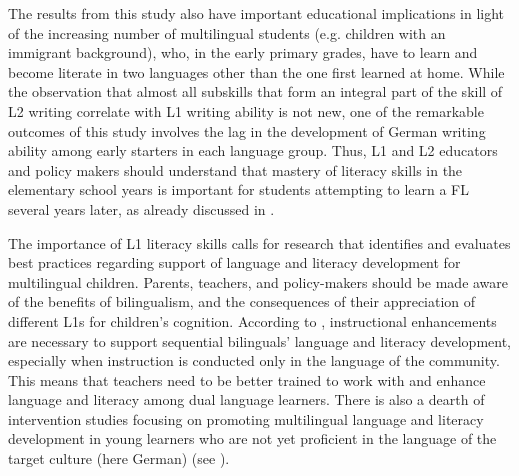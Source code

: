 \documentclass[output=paper,modfonts,nonflat,newtxmath]{langsci/langscibook}
\begin{document}
The results from this study also have important educational implications in light of the increasing number of multilingual students (e.g. children with an immigrant background), who, in the early primary grades, have to learn and become literate in two languages other than the one first learned at home. While the observation that almost all subskills that form an integral part of the skill of L2 writing correlate with L1 writing ability is not new, one of the remarkable outcomes of this study involves the lag in the development of German writing ability among early starters in each language group. Thus, L1 and L2 educators and policy makers should understand that mastery of literacy skills in the elementary school years is important for students attempting to learn a FL several years later, as already discussed in \citet{Pfenninger2014}.

The importance of L1 literacy skills calls for research that identifies and evaluates best practices regarding support of language and literacy development for multilingual children. Parents, teachers, and policy-makers should be made aware of the benefits of bilingualism, and the consequences of their appreciation of different L1s for children’s cognition. According to \citet{GoldenbergEtAl2006}, instructional enhancements are necessary to support sequential bilinguals’ language and literacy development, especially when instruction is conducted only in the language of the community. This means that teachers need to be better trained to work with and enhance language and literacy among dual language learners. There is also a dearth of intervention studies focusing on promoting multilingual language and literacy development in young learners who are not yet proficient in the language of the target culture (here German) (see \citealt{AugustShanahan2006}).
\end{document}
